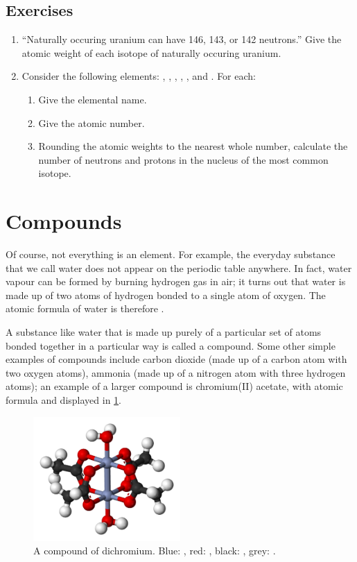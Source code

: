 \documentclass[a4paper]{memoir}
\begin{document}
\subsection*{Exercises}
\begin{enumerate}
  \item ``Naturally occuring uranium can have 146, 143, or 142 neutrons.'' Give the atomic weight of each isotope of naturally occuring uranium.
  \item Consider the following elements: , , , , , and . For each:
    \begin{enumerate}
      \item Give the elemental name.
      \item Give the atomic number.
      \item Rounding the atomic weights to the nearest whole number, calculate the number of neutrons and protons in the nucleus of the most
            common isotope.
    \end{enumerate}
\end{enumerate}

\section{Compounds}
Of course, not everything is an element. For example, the everyday substance that we call water does not appear on the periodic table anywhere. In
fact, water vapour can be formed by burning hydrogen gas in air; it turns out that water is made up of two atoms of hydrogen bonded to a single atom
of oxygen. The atomic formula of water is therefore .

\begin{center}
\end{center}

A substance like water that is made up purely of a particular set of atoms bonded together in a particular way is called a compound. Some other simple
examples of compounds include carbon dioxide (made up of a carbon atom with two oxygen atoms), ammonia (made up of a nitrogen atom with three hydrogen
atoms); an example of a larger compound is chromium(II) acetate, with atomic formula  and displayed in \cref{fig:cr2ac}.

\begin{figure}
  \centering
  \includegraphics[width=0.5\textwidth]{cr2ac}
  \caption{A compound of dichromium. Blue: , red: , black: , grey: .\label{fig:cr2ac}}
\end{figure}
\end{document}
